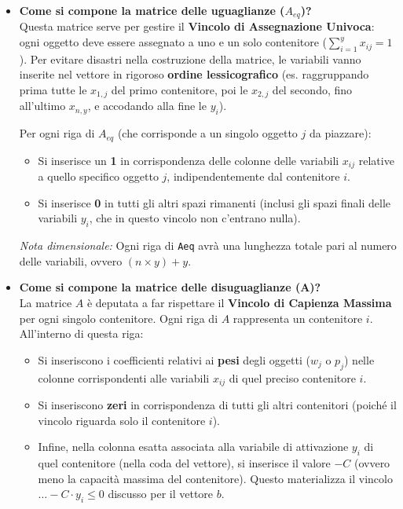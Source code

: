 \documentclass[12pt, a4paper]{article}
\begin{document}
\begin{itemize}[label=\textcolor{titlecolor}{\Large\textbullet}, itemsep=6pt, leftmargin=1.5cm]
		\item \textbf{Come si compone la matrice delle uguaglianze ($A_{eq}$)?}\\
		Questa matrice serve per gestire il \textbf{Vincolo di Assegnazione Univoca}: ogni oggetto deve essere assegnato a uno e un solo contenitore ($\sum_{i=1}^y x_{ij} = 1$).
		Per evitare disastri nella costruzione della matrice, le variabili vanno inserite nel vettore in rigoroso \textbf{ordine lessicografico} (es. raggruppando prima tutte le $x_{1,j}$ del primo contenitore, poi le $x_{2,j}$ del secondo, fino all'ultimo $x_{n,y}$, e accodando alla fine le $y_i$).
		
		Per ogni riga di \texttt{$A_{eq}$} (che corrisponde a un singolo oggetto $j$ da piazzare):
		\begin{itemize}[label=$\circ$, itemsep=1pt]
			\item Si inserisce un \textbf{1} in corrispondenza delle colonne delle variabili $x_{ij}$ relative a quello specifico oggetto $j$, indipendentemente dal contenitore $i$.
			\item Si inserisce \textbf{0} in tutti gli altri spazi rimanenti (inclusi gli spazi finali delle variabili $y_i$, che in questo vincolo non c'entrano nulla).
		\end{itemize}
		\textit{Nota dimensionale:} Ogni riga di \texttt{Aeq} avrà una lunghezza totale pari al numero delle variabili, ovvero $(n \times y) + y$.
		
		\item \textbf{Come si compone la matrice delle disuguaglianze (A)?}\\
		La matrice $A$ è deputata a far rispettare il \textbf{Vincolo di Capienza Massima} per ogni singolo contenitore. 
		Ogni riga di $A$ rappresenta un contenitore $i$. All'interno di questa riga:
		\begin{itemize}[label=$\circ$, itemsep=1pt]
			\item Si inseriscono i coefficienti relativi ai \textbf{pesi} degli oggetti ($w_j$ o $p_j$) nelle colonne corrispondenti alle variabili $x_{ij}$ di quel preciso contenitore $i$.
			\item Si inseriscono \textbf{zeri} in corrispondenza di tutti gli altri contenitori (poiché il vincolo riguarda solo il contenitore $i$).
			\item Infine, nella colonna esatta associata alla variabile di attivazione $y_i$ di quel contenitore (nella coda del vettore), si inserisce il valore \textbf{$-C$} (ovvero meno la capacità massima del contenitore). Questo materializza il vincolo $\dots - C \cdot y_i \leq 0$ discusso per il vettore $b$.
		\end{itemize}
	\end{itemize}
	
\end{document}
